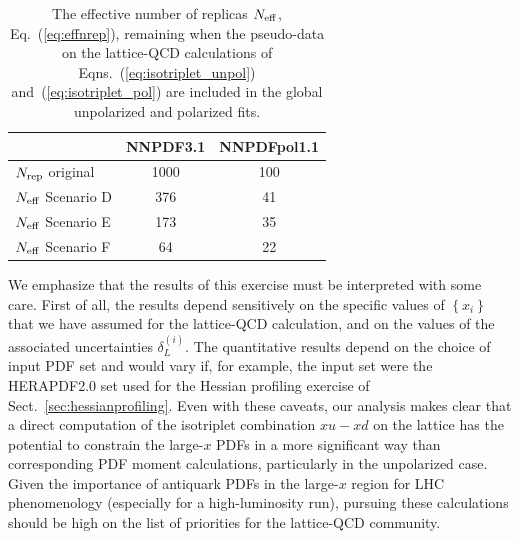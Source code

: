 \begin{table}[!t]
\centering
\footnotesize
\renewcommand{\arraystretch}{1.3} 
\begin{tabular}{lcc}
\toprule
&  NNPDF3.1  &  NNPDFpol1.1 \\
\midrule
$N_{\rm rep}$ original   & 1000 & 100 \\
$N_{\rm eff}$ Scenario D &  376 &  41 \\
$N_{\rm eff}$ Scenario E &  173 &  35 \\
$N_{\rm eff}$ Scenario F &  64  &  22 \\
\bottomrule
\end{tabular}
\caption{\small The effective number of replicas
  $N_{\rm eff}$, Eq.~(\ref{eq:effnrep}), remaining when the pseudo-data
  on the lattice-QCD calculations
  of Eqns.~(\ref{eq:isotriplet_unpol})
  and~(\ref{eq:isotriplet_pol}) 
  are included in the global
  unpolarized and polarized fits. 
  \label{tab:neffxspace}
  }
\end{table}

We emphasize that the results of this exercise must be interpreted
with some care.
%
First of all, the results depend sensitively on the specific values of
$\left\{ x_i \right\}$
that we have assumed for the lattice-QCD calculation,
and on the values
of the associated uncertainties $\delta_L^{(i)}$.
%
The quantitative results depend on the choice of input PDF set and would 
vary if, for example, the input set were the HERAPDF2.0 set used for the 
Hessian profiling exercise of Sect.~\ref{sec:hessianprofiling}.
%
Even with these caveats, our analysis makes clear that a direct
computation of the isotriplet combination $x u-x d$ on the lattice
has the potential to constrain the large-$x$ PDFs in
a more significant way than corresponding PDF moment calculations,
particularly in the unpolarized case.
%
Given the importance of antiquark PDFs in the large-$x$ region for LHC 
phenomenology (especially for a high-luminosity run), 
pursuing these calculations should be high on the list
of priorities for the lattice-QCD community.



